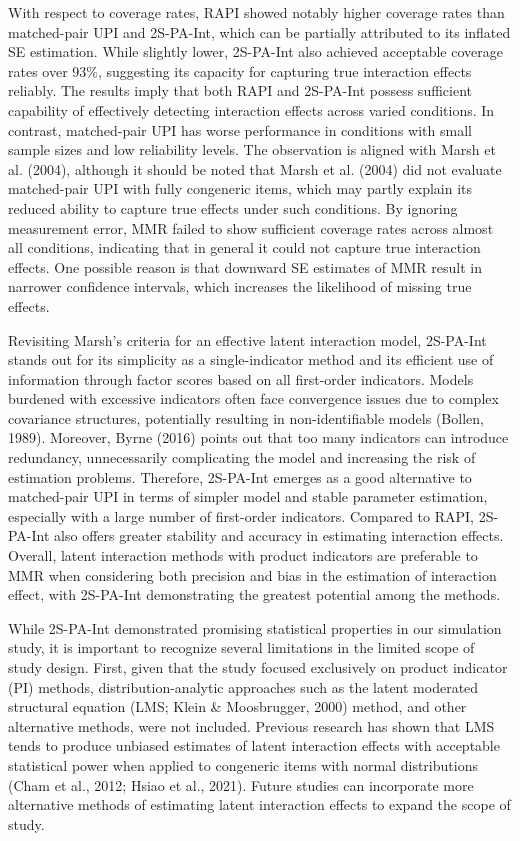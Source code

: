 \documentclass[
  man,mask]{apa6}
\begin{document}
With respect to coverage rates, RAPI showed notably higher coverage rates than matched-pair UPI and 2S-PA-Int, which can be partially attributed to its inflated SE estimation. While slightly lower, 2S-PA-Int also achieved acceptable coverage rates over 93\%, suggesting its capacity for capturing true interaction effects reliably. The results imply that both RAPI and 2S-PA-Int possess sufficient capability of effectively detecting interaction effects across varied conditions. In contrast, matched-pair UPI has worse performance in conditions with small sample sizes and low reliability levels. The observation is aligned with Marsh et al. (2004), although it should be noted that Marsh et al. (2004) did not evaluate matched-pair UPI with fully congeneric items, which may partly explain its reduced ability to capture true effects under such conditions. By ignoring measurement error, MMR failed to show sufficient coverage rates across almost all conditions, indicating that in general it could not capture true interaction effects. One possible reason is that downward SE estimates of MMR result in narrower confidence intervals, which increases the likelihood of missing true effects.

Revisiting Marsh's criteria for an effective latent interaction model, 2S-PA-Int stands out for its simplicity as a single-indicator method and its efficient use of information through factor scores based on all first-order indicators. Models burdened with excessive indicators often face convergence issues due to complex covariance structures, potentially resulting in non-identifiable models (Bollen, 1989). Moreover, Byrne (2016) points out that too many indicators can introduce redundancy, unnecessarily complicating the model and increasing the risk of estimation problems. Therefore, 2S-PA-Int emerges as a good alternative to matched-pair UPI in terms of simpler model and stable parameter estimation, especially with a large number of first-order indicators. Compared to RAPI, 2S-PA-Int also offers greater stability and accuracy in estimating interaction effects. Overall, latent interaction methods with product indicators are preferable to MMR when considering both precision and bias in the estimation of interaction effect, with 2S-PA-Int demonstrating the greatest potential among the methods.

While 2S-PA-Int demonstrated promising statistical properties in our simulation study, it is important to recognize several limitations in the limited scope of study design. First, given that the study focused exclusively on product indicator (PI) methods, distribution-analytic approaches such as the latent moderated structural equation (LMS; Klein \& Moosbrugger, 2000) method, and other alternative methods, were not included. Previous research has shown that LMS tends to produce unbiased estimates of latent interaction effects with acceptable statistical power when applied to congeneric items with normal distributions (Cham et al., 2012; Hsiao et al., 2021). Future studies can incorporate more alternative methods of estimating latent interaction effects to expand the scope of study.
\end{document}
